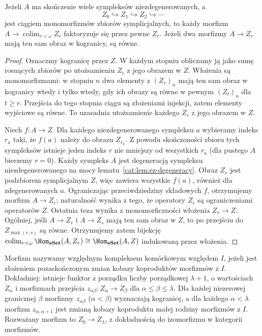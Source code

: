 \begin{lemat}\label{cat:lem:simplicial-finite-smallness}
Jeżeli $A$ ma skończenie wiele sympleksów niezdegenerowanych, a
\[
 Z_0\hookrightarrow Z_1\hookrightarrow Z_2\hookrightarrow\cdots
\]
jest ciągiem monomorfizmów zbiorów symplicjalnych, to każdy morfizm $A\to\operatorname{colim}_{r<\omega}Z_r$ faktoryzuje się przez pewne $Z_r$. Jeżeli dwa morfizmy $A\to Z_r$ mają ten sam obraz w kogranicy, są równe.
\end{lemat}
\begin{proof}
Oznaczmy kogranicę przez $Z$. W każdym stopniu obliczamy ją jako sumę rosnących zbiorów po utożsamieniu $Z_r$ z jego obrazem w $Z$. Włożenia są monomorfizmami: w stopniu $n$ dwa elementy z $(Z_r)_n$ mają ten sam obraz w kogranicy wtedy i tylko wtedy, gdy ich obrazy są równe w pewnym $(Z_t)_n$ dla $t\geq r$. Przejścia do tego stopnia ciągu są złożeniami injekcji, zatem elementy wyjściowe są równe. To uzasadnia utożsamienie każdego $Z_r$ z jego obrazem w $Z$.

Niech $f:A\to Z$. Dla każdego niezdegenerowanego sympleksu $a$ wybieramy indeks $r_a$ taki, że $f(a)$ należy do obrazu $Z_{r_a}$. Z powodu skończoności zbioru tych sympleksów istnieje jeden indeks $r$ nie mniejszy od wszystkich $r_a$ (dla pustego $A$ bierzemy $r=0$). Każdy sympleks $A$ jest degeneracją sympleksu niezdegenerowanego na mocy lematu~\ref{cat:lem:ez-degeneracy}. Obraz $Z_r$ jest podzbiorem symplicjalnym $Z$, więc zawiera wszystkie $f(a)$, również dla zdegenerowanych $a$. Ograniczając przeciwdziedziny składowych $f$, otrzymujemy morfizm $A\to Z_r$; naturalność wynika z tego, że operatory $Z_r$ są ograniczeniami operatorów $Z$. Ostatnia teza wynika z monomorficzności włożenia $Z_r\to Z$. Ogólniej, jeśli $A\to Z_r$ i $A\to Z_s$ mają ten sam obraz w $Z$, to po przejściu do $Z_{\max(r,s)}$ są równe. Otrzymujemy zatem bijekcję $\operatorname{colim}_{r<\omega}\Hom_{\mathbf{sSet}}(A,Z_r)\cong\Hom_{\mathbf{sSet}}(A,Z)$ indukowaną przez włożenia.
\end{proof}

\begin{definicja}\label{cat:def:relative-cell-complex}
Morfizm nazywamy względnym kompleksem komórkowym względem $I$, jeżeli jest złożeniem pozaskończonym zmian kobazy koproduktów morfizmów z $I$. Dokładniej: istnieje funktor z porządku liczby porządkowej $\lambda+1$, o wartościach $Z_\alpha$ i morfizmach przejścia $z_{\alpha\beta}:Z_\alpha\to Z_\beta$ dla $\alpha\leq\beta\leq\lambda$. Dla każdej niezerowej granicznej $\beta$ morfizmy $z_{\alpha\beta}$ ($\alpha<\beta$) wyznaczają kogranicę, a dla każdego $\alpha<\lambda$ morfizm $z_{\alpha,\alpha+1}$ jest zmianą kobazy koproduktu małej rodziny morfizmów z $I$. Rozważany morfizm to $Z_0\to Z_\lambda$, z dokładnością do izomorfizmu w kategorii morfizmów.
\end{definicja}

